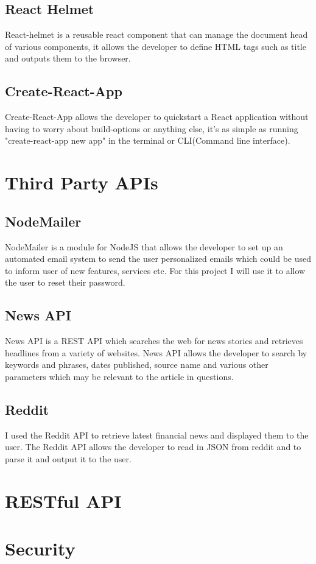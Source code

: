 \subsection{React Helmet}
React-helmet is a reusable react component that can manage the document head of various components, it allows the developer to define HTML tags such as title and outputs them to the browser\cite{ReactHelmet}.
\subsection{Create-React-App}
Create-React-App allows the developer to quickstart a React application without having to worry about build-options or anything else, it's as simple as running "create-react-app new app" in the terminal or CLI(Command line interface)\cite{CreateReactApp}.
\section{Third Party APIs}
\subsection{NodeMailer}
NodeMailer is a module for NodeJS that allows the developer to set up an automated email system to send the user personalized emails which could be used to inform user of new features, services etc. For this project I will use it to allow the user to reset their password.
\subsection{News API}
News API is a REST API which searches the web for news stories and retrieves headlines from a variety of websites\cite{NewsAPI}.  News API allows the developer to search by keywords and phrases, dates published, source name and various other parameters which may be relevant to the article in questions.
\subsection{Reddit}
I used the Reddit API to retrieve latest financial news and displayed them to the user.  The Reddit API allows the developer to read in JSON from reddit and to parse it and output it to the user.
\section{RESTful API}
\section{Security}
